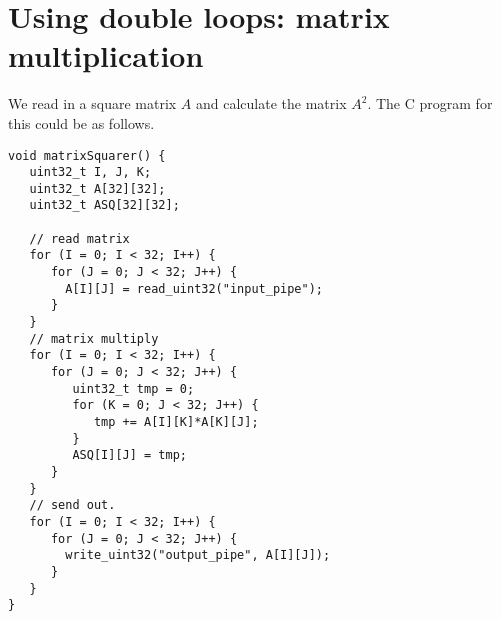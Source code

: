 \documentclass[12pt]{article}
\begin{document}
\section{Using double loops: matrix multiplication}

We read in a square matrix $A$ and calculate the 
matrix $A^2$.  The C program for this could be as follows.
\begin{verbatim}
void matrixSquarer() {
   uint32_t I, J, K;
   uint32_t A[32][32];
   uint32_t ASQ[32][32];

   // read matrix
   for (I = 0; I < 32; I++) {
      for (J = 0; J < 32; J++) {
        A[I][J] = read_uint32("input_pipe");
      }
   }
   // matrix multiply
   for (I = 0; I < 32; I++) {
      for (J = 0; J < 32; J++) {
         uint32_t tmp = 0;
         for (K = 0; J < 32; J++) {
            tmp += A[I][K]*A[K][J];
         }
         ASQ[I][J] = tmp;
      }
   }
   // send out.
   for (I = 0; I < 32; I++) {
      for (J = 0; J < 32; J++) {
        write_uint32("output_pipe", A[I][J]);
      }
   }
}
\end{verbatim}
\end{document}
